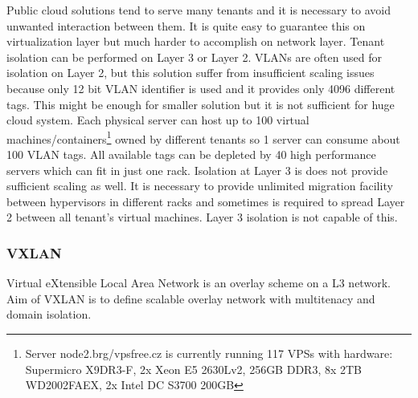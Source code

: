 Public cloud solutions tend to serve many tenants and it is necessary to avoid unwanted interaction between them. It is quite easy to guarantee this on virtualization layer but much harder to accomplish on network layer. Tenant isolation can be performed on Layer 3 or Layer 2. \Ac{VLAN}s are often used for isolation on Layer 2, but this solution suffer from insufficient scaling issues because only 12 bit \Ac{VLAN} identifier is used and it provides only 4096 different tags. This might be enough for smaller solution but it is not sufficient for huge cloud system. Each physical server can host up to 100 virtual machines/containers\footnote{Server node2.brg/vpsfree.cz is currently running 117 \Ac{VPS}s with hardware: Supermicro \mbox{X9DR3-F}, 2x Xeon E5 2630Lv2, 256GB DDR3, 8x 2TB WD2002FAEX, 2x Intel DC S3700 200GB} owned by different tenants so 1 server can consume about 100 \Ac{VLAN} tags. All available tags can be depleted by 40 high performance servers which can fit in just one rack. Isolation at Layer 3 is does not provide sufficient scaling as well. It is necessary to provide unlimited migration facility between hypervisors in different racks and sometimes is required to spread Layer 2 between all tenant's virtual machines. Layer 3 isolation is not capable of this.



\subsubsection{VXLAN}
Virtual eXtensible Local Area Network is an overlay scheme on a L3 network. \cite{rfc7348} Aim of \Ac{VXLAN} is to define scalable overlay network with multitenacy and domain isolation. 


